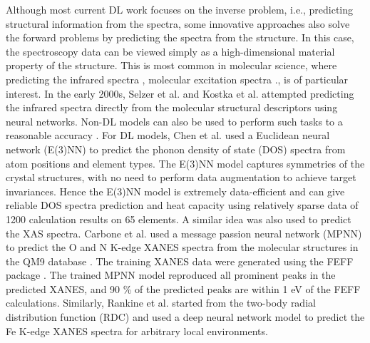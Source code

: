 \documentclass[pdflatex,sn-mathphys]{sn-jnl}%
\theoremstyle{thmstyleone}%
\theoremstyle{thmstyletwo}%
\theoremstyle{thmstylethree}%
\begin{document}
Although most current DL work focuses on the inverse problem, i.e., predicting structural information from the spectra, some innovative approaches also solve the forward problems by predicting the spectra from the structure. In this case, the spectroscopy data can be viewed simply as a high-dimensional material property of the structure. This is most common in molecular science, where predicting the infrared spectra \cite{selzer_gasteiger_thomas_salzer_2000}, molecular excitation spectra \cite{ghosh_rinke_2019}., is of particular interest. In the early 2000s, Selzer et al. \cite{selzer_gasteiger_thomas_salzer_2000} and Kostka et al. \cite{kostka_selzer_gasteiger_2001} attempted predicting the infrared spectra directly from the molecular structural descriptors using neural networks. Non-DL models can also be used to perform such tasks to a reasonable accuracy \cite{mahmoudLearningElectronicDensity2020}. For DL models, Chen et al. \cite{chenDirectPredictionPhonon2021} used a Euclidean neural network (E(3)NN) to predict the phonon density of state (DOS) spectra from atom positions and element types. The E(3)NN model captures symmetries of the crystal structures, with no need to perform data augmentation to achieve target invariances. Hence the E(3)NN model is extremely data-efficient and can give reliable DOS spectra prediction and heat capacity using relatively sparse data of 1200 calculation results on 65 elements. A similar idea was also used to predict the XAS spectra. Carbone et al. \cite{carboneMachineLearningXRayAbsorption2020a} used a message passion neural network (MPNN) to predict the O and N K-edge XANES spectra from the molecular structures in the QM9 database \cite{ramakrishnan2014quantum}. The training XANES data were generated using the FEFF package \cite{rehrParameterfreeCalculationsXray2010}. The trained MPNN model reproduced all prominent peaks in the predicted XANES, and 90 \% of the predicted peaks are within 1 eV of the FEFF calculations. Similarly, Rankine et al. \cite{rankineDeepNeuralNetwork2020} started from the two-body radial distribution function (RDC) and used a deep neural network model to predict the Fe K-edge XANES spectra for arbitrary local environments. 
\end{document}
